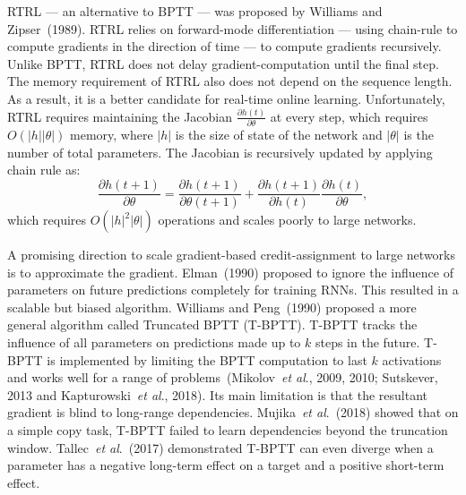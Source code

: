 \documentclass{article}
\newcommand{\etal}{\textit{et al}.}
\begin{document}
RTRL --- an alternative to BPTT --- was proposed by Williams and Zipser~(1989). RTRL relies on forward-mode differentiation --- using chain-rule to compute gradients in the direction of time --- to compute gradients recursively. Unlike BPTT, RTRL does not delay gradient-computation until the final step. The memory requirement of RTRL also does not depend on the sequence length. As a result, it is a better candidate for real-time online learning. Unfortunately, RTRL requires maintaining the Jacobian $\frac{\partial h(t)}{\partial \theta}$ at every step, which requires $O(|h||\theta|)$ memory, where $|h|$ is the size of state of the network and $|\theta|$ is the number of total parameters. The Jacobian is recursively updated by applying chain rule as:  
$$\frac{\partial h(t+1)}{\partial \theta} =\frac{\partial h(t+1)}{\partial \theta(t+1)} +  \frac{\partial h(t+1)}{\partial h(t)}\frac{\partial h(t)}{\partial \theta}, $$ 
which requires  $O(|h|^2|\theta|)$ operations and scales poorly to large networks.

 
 

A promising direction to scale gradient-based credit-assignment to large networks is to approximate the gradient. Elman~(1990) proposed to ignore the influence of parameters on future predictions completely for training RNNs. This resulted in a scalable but biased algorithm. Williams and Peng~(1990) proposed a more general algorithm called Truncated BPTT (T-BPTT). T-BPTT tracks the influence of all parameters on predictions made up to $k$ steps in the future. T-BPTT is implemented by limiting the BPTT computation to last $k$ activations and works well for a range of problems~(Mikolov~\etal, 2009, 2010; Sutskever, 2013 and Kapturowski~\etal, 2018). Its main limitation is that the resultant gradient is blind to long-range dependencies. Mujika~\etal~(2018) showed that on a simple copy task, T-BPTT failed to learn dependencies beyond the truncation window. Tallec~\etal~(2017) demonstrated T-BPTT can even diverge when a parameter has a negative long-term effect on a target and a positive short-term effect. 
\end{document}
